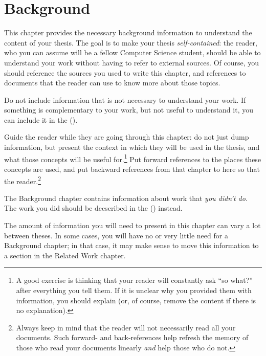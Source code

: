 \chapter{Background}
\label{ch:background}

This chapter provides the necessary background information to understand the content of your thesis.
The goal is to make your thesis \emph{self-contained}: the reader, who you can assume will be
a fellow Computer Science student, should be able to understand your work without having to refer
to external sources. Of course, you should reference the sources you used to write this chapter, and references to documents that the reader can use to know more about those topics.

Do not include information that is not necessary to understand your work. If something is
complementary to your work, but not useful to understand it, you can include it in the
 ().

Guide the reader while they are going through this chapter: do not just dump information, but present the context in which they will be used in the thesis, and what those concepts will be useful for.\footnote{A good exercise is thinking that your reader will constantly ask ``so what?'' after everything you tell them. If it is unclear why you provided them with information, you should explain (or, of course, remove the content if there is no explanation).}
Put forward references to the places these concepts are used, and put backward references from that chapter to here so that the reader.\footnote{Always keep in mind that the reader will not necessarily read all your documents. Such forward- and back-references help refresh the memory of those who read your documents linearly \emph{and} help those who do not.}

The Background chapter contains information about work that \emph{you didn't do}. The work you
did should be decscribed in the  () instead.

The amount of information you will need to present in this chapter can vary a lot between theses.
In some cases, you will have no or very little need for a Background chapter; in that case, it
may make sense to move this information to a section in the Related Work chapter.
